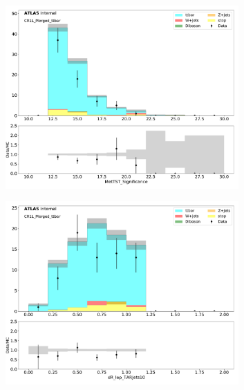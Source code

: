 \begin{figure}[htbp]
\begin{subfigure}{0.49\textwidth}
     \includegraphics[width = 0.98\textwidth]{Figures/4/datamc/CR1L_Merged_ttbar/MetTST_Significance.pdf}
     \caption{\metsig}
     \end{subfigure}
     \begin{subfigure}{0.49\textwidth}
     \includegraphics[width = 0.98\textwidth]{Figures/4/datamc/CR1L_Merged_ttbar/dR_lep_TARJets10.pdf}
     \caption{\drTARl}
     \end{subfigure}
     \begin{subfigure}{0.49\textwidth}

\end{subfigure}
\end{figure}
